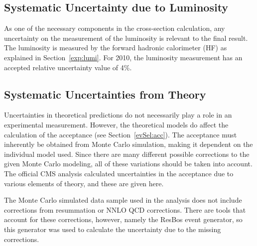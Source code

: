 \subsection{Systematic Uncertainty due to Luminosity}
\label{anMeth:SystsLumi}


As one of the necessary components in the 
cross-section calculation, 
any uncertainty on the measurement of the luminosity 
is relevant to the final result.  
The luminosity is measured by the forward hadronic calorimeter (HF) 
as explained in Section~\ref{exp:lumi}.  
For 2010, the luminosity measurement has an accepted 
relative uncertainty value of 4\%.  %

\subsection{Systematic Uncertainties from Theory}
\label{anMeth:SystsTheory}



Uncertainties in theoretical predictions do not 
necessarily play a role in an experimental measurement.  
However, the theoretical models do affect the 
calculation of the acceptance (see Section~\ref{evSel:acc}).  
The acceptance must inherently be obtained from 
Monte Carlo simulation, making it dependent on the 
individual model used.  
Since there are many different possible corrections 
to the given Monte Carlo modeling, 
all of these variations should be taken into account.  
The official CMS \Zee analysis calculated %
uncertainties in the acceptance due to 
various elements of theory, 
and these are given here.  




The Monte Carlo simulated data sample used in the analysis 
does not include corrections from resummation or 
NNLO QCD corrections.  
There are tools that account for these corrections, 
however, 
namely the ResBos event generator, %
so this generator was used to 
calculate the uncertainty due to the missing corrections.  


